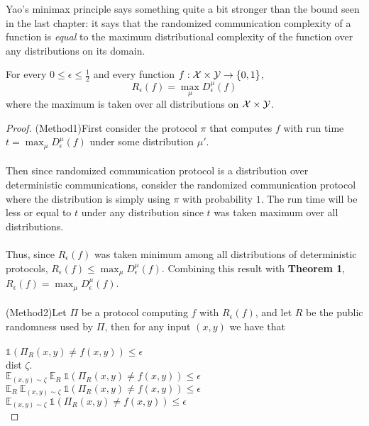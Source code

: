 Yao's minimax principle says something quite a bit stronger than the bound seen in the last chapter: it says that the randomized communication complexity of a function is \emph{equal} to the maximum distributional complexity of the function over any distributions on its domain.

\begin{theorem}
	For every $0 \le \epsilon \le \frac12$ and every function $f : \mathcal{X} \times \mathcal{Y} \to \{0,1\}$, 
	\[
	R_\epsilon(f) = \max_{\mu} D_\epsilon^\mu(f)
	\]
	where the maximum is taken over all distributions on $\mathcal{X} \times \mathcal{Y}$.
\end{theorem}

\begin{proof}
	(Method1)First consider the protocol $\pi$ that computes $f$ with run time $t=\max_{\mu} D_\epsilon^\mu(f)$ under some distribution $\mu'$. \\
	\\
	Then since randomized communication protocol is a distribution over deterministic communications, consider the randomized communication protocol where the distribution is simply using $\pi$ with probability $1$. The run time will be less or equal to $t$ under any distribution since $t$ was taken maximum over all distributions. \\
	\\
	Thus, since $R_\epsilon(f)$ was taken minimum among all distributions of deterministic protocols, $R_\epsilon(f) 
	\leq \max_{\mu} D_\epsilon^\mu(f)$. Combining this result with \textbf{Theorem 1}, $R_\epsilon(f) = \max_{\mu} D_\epsilon^\mu(f)$.\\
	\\
	(Method2)Let $\Pi$ be a protocol computing $f$ with $R_\epsilon(f)$, and let $R$ be the public randomness used by $\Pi$, then for any input $(x,y)$ we have that \\
	\\ 
	$\mathds{1}(\Pi_R(x,y)\neq f(x,y))\leq \epsilon$\\
	dist $\zeta$.\\
	$\mathbb{E}_{(x,y)\sim \zeta}\ \mathbb{E}_R\ \mathds{1}(\Pi_R(x,y)\neq f(x,y))\leq \epsilon$\\
	$\mathbb{E}_R\ \mathbb{E}_{(x,y)\sim \zeta}\  \mathds{1}(\Pi_R(x,y)\neq f(x,y))\leq \epsilon$\\
	$\mathbb{E}_{(x,y)\sim \zeta}\  \mathds{1}(\Pi_R(x,y)\neq f(x,y))\leq \epsilon$\\
\end{proof}



